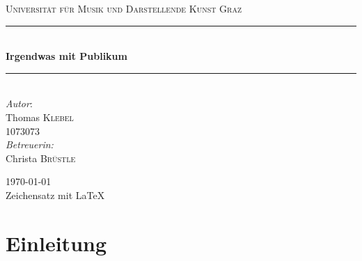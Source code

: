 \documentclass[a4paper, german, oneside]{scrbook}
\date{\displaydate{date}}
\begin{document}
	\begin{titlepage}
	
		\begin{center}



		\textsc{\LARGE Universität für Musik und Darstellende Kunst Graz}\\[1.5cm]



		\newcommand{\HRule}{\rule{\linewidth}{0.5mm}}
		\HRule \\[0.4cm]
		{ \huge \bfseries Irgendwas mit Publikum}\\[0.4cm]

		\HRule \\[2.5cm] %



		\Large \emph{Autor}:\\
		Thomas \textsc{Klebel}\\[0.1cm]
		\large 1073073\\[1cm]

		\Large \emph{Betreuerin:}\\
		Christa \textsc{Brüstle}\\[1cm]



		\vfill

		\Large{\today}\\[1cm]
		\normalsize{Zeichensatz mit \LaTeX}
		

		\end{center}

	\end{titlepage}

	
\clearpage
\setcounter{page}{1}

\tableofcontents

\chapter*{Einleitung}
\end{document}
